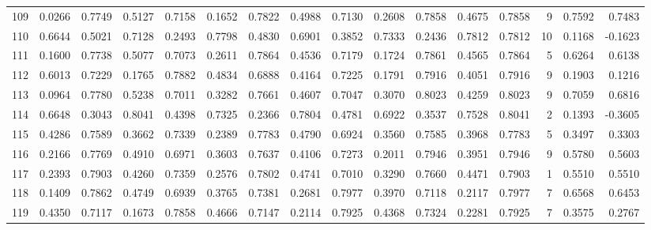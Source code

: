 \begin{tabular}{lrrrrrrrrrrrrrrr}
109 &      0.0266 &  0.7749 &  0.5127 &  0.7158 &  0.1652 &  0.7822 &  0.4988 &  0.7130 &  0.2608 &  0.7858 &   0.4675 &     0.7858 &      9 &                    0.7592 &                     0.7483 \\
110 &      0.6644 &  0.5021 &  0.7128 &  0.2493 &  0.7798 &  0.4830 &  0.6901 &  0.3852 &  0.7333 &  0.2436 &   0.7812 &     0.7812 &     10 &                    0.1168 &                    -0.1623 \\
111 &      0.1600 &  0.7738 &  0.5077 &  0.7073 &  0.2611 &  0.7864 &  0.4536 &  0.7179 &  0.1724 &  0.7861 &   0.4565 &     0.7864 &      5 &                    0.6264 &                     0.6138 \\
112 &      0.6013 &  0.7229 &  0.1765 &  0.7882 &  0.4834 &  0.6888 &  0.4164 &  0.7225 &  0.1791 &  0.7916 &   0.4051 &     0.7916 &      9 &                    0.1903 &                     0.1216 \\
113 &      0.0964 &  0.7780 &  0.5238 &  0.7011 &  0.3282 &  0.7661 &  0.4607 &  0.7047 &  0.3070 &  0.8023 &   0.4259 &     0.8023 &      9 &                    0.7059 &                     0.6816 \\
114 &      0.6648 &  0.3043 &  0.8041 &  0.4398 &  0.7325 &  0.2366 &  0.7804 &  0.4781 &  0.6922 &  0.3537 &   0.7528 &     0.8041 &      2 &                    0.1393 &                    -0.3605 \\
115 &      0.4286 &  0.7589 &  0.3662 &  0.7339 &  0.2389 &  0.7783 &  0.4790 &  0.6924 &  0.3560 &  0.7585 &   0.3968 &     0.7783 &      5 &                    0.3497 &                     0.3303 \\
116 &      0.2166 &  0.7769 &  0.4910 &  0.6971 &  0.3603 &  0.7637 &  0.4106 &  0.7273 &  0.2011 &  0.7946 &   0.3951 &     0.7946 &      9 &                    0.5780 &                     0.5603 \\
117 &      0.2393 &  0.7903 &  0.4260 &  0.7359 &  0.2576 &  0.7802 &  0.4741 &  0.7010 &  0.3290 &  0.7660 &   0.4471 &     0.7903 &      1 &                    0.5510 &                     0.5510 \\
118 &      0.1409 &  0.7862 &  0.4749 &  0.6939 &  0.3765 &  0.7381 &  0.2681 &  0.7977 &  0.3970 &  0.7118 &   0.2117 &     0.7977 &      7 &                    0.6568 &                     0.6453 \\
119 &      0.4350 &  0.7117 &  0.1673 &  0.7858 &  0.4666 &  0.7147 &  0.2114 &  0.7925 &  0.4368 &  0.7324 &   0.2281 &     0.7925 &      7 &                    0.3575 &                     0.2767 \\

\end{tabular}
